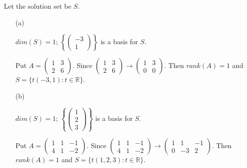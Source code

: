 \begin{Exercise}
Let the solution set be $S$.
\begin{enumerate}[(a)]
\item[(a)]
\begin{answer}
$dim(S) = 1$; $\left\{\begin{pmatrix}
-3 \\
1
\end{pmatrix}\right\}$ is a basis for $S$.
\end{answer}
\begin{solution}
Put $A = \begin{pmatrix}
1 & 3 \\
2 & 6
\end{pmatrix}$. Since $\begin{pmatrix}
1 & 3 \\
2 & 6
\end{pmatrix} \longrightarrow \begin{pmatrix}
1 & 3 \\
0 & 0
\end{pmatrix}$. Then $rank(A) = 1$ and $S=\{t(-3,1):t\in \mathbb{R}\}$.
\end{solution}

\item[(b)]
\begin{answer}
$dim(S) = 1$; $\left\{\begin{pmatrix}
1 \\
2 \\
3
\end{pmatrix}\right\}$ is a basis for $S$.
\end{answer}
\begin{solution}
Put $A = \begin{pmatrix}
1 & 1 & -1 \\
4 & 1 & -2
\end{pmatrix}$. Since $\begin{pmatrix}
1 & 1 & -1 \\
4 & 1 & -2
\end{pmatrix} \longrightarrow \begin{pmatrix}
1 & 1 & -1 \\
0 & -3 & 2
\end{pmatrix}$. Then $rank(A) = 1$ and $S=\{t(1,2,3):t\in \mathbb{R}\}$.
\end{solution}

\end{enumerate}
\end{Exercise}